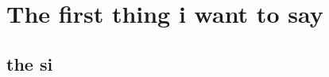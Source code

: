 \documentclass{book}
\begin{document}
\chapter{The first thing i want to say}
\section{the si}
\end{document}
